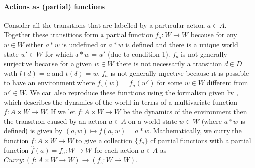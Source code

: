 \paragraph{Actions as (partial) functions}
Consider all the transitions that are labelled by a particular action $a \in A$.
Together these transitions form a partial function $f_{a}: W \to W$ because for any $w \in W$ either $a * w$ is undefined or $a * w$ is defined and there is a unique world state $w' \in W$ for which $a * w = w'$ (due to condition 1).
$f_{a}$ is not generally surjective because for a given $w \in W$ there is not necessarily a transition $d \in D$ with $l(d) = a$ and $t(d) = w$.
$f_{a}$ is not generally injective because it is possible to have an environment where $f_{a}(w)=f_{a}(w')$ for some $w \in W$ different from $w' \in W$.
We can also reproduce these functions using the formalism given by \autocite{caselles2019symmetry}, which describes the dynamics of the world in terms of a multivariate function $f: A \times W \to W$.
If we let $f: A \times W \to W$ be the dynamics of the environment then the transition caused by an action $a \in A$ on a world state $w \in W$ (where $a * w$ is defined) is given by $(a,w) \mapsto f(a,w) = a * w$.
Mathematically, we curry the function $f: A \times W \to W$ to give a collection $\{f_{a}\}$ of partial functions with a partial function $\hat{f}(a)=f_{a}: W \to W$ for each action $a \in A$ as $\textit{Curry}: (f: A \times W \to W) \to (f_{a}: W \to W)$.
